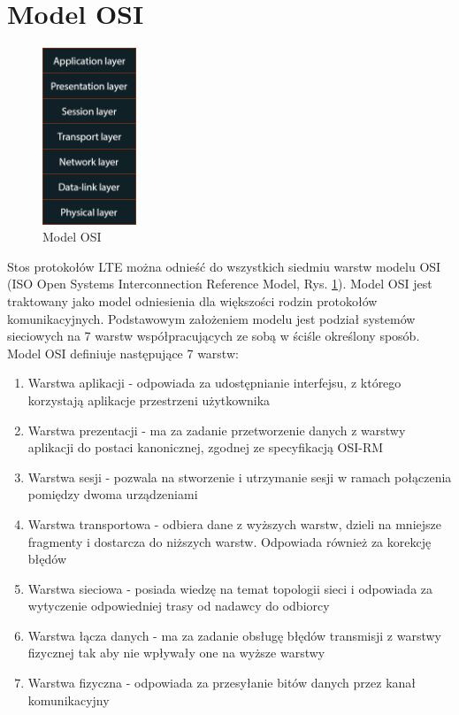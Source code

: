 \section{Model OSI}

\begin{figure}
	\centerline{\includegraphics[width=0.25\textwidth]{images/osi.png}}
	\caption{Model OSI}
	\label{fig:osi}
\end{figure}

Stos protokołów LTE można odnieść do wszystkich siedmiu warstw modelu OSI (ISO Open Systems Interconnection Reference Model, Rys. \ref{fig:osi}). Model OSI jest traktowany jako model odniesienia dla większości rodzin protokołów komunikacyjnych. Podstawowym założeniem modelu jest podział systemów sieciowych na 7 warstw współpracujących ze sobą w ściśle określony sposób. \cite{Wiki01} Model OSI definiuje następujące 7 warstw:

\begin{enumerate}
	\item Warstwa aplikacji - odpowiada za udostępnianie interfejsu, z którego korzystają aplikacje przestrzeni użytkownika
	\item Warstwa prezentacji - ma za zadanie przetworzenie danych z warstwy aplikacji do postaci kanonicznej, zgodnej ze specyfikacją OSI-RM
	\item Warstwa sesji - pozwala na stworzenie i utrzymanie sesji w ramach połączenia pomiędzy dwoma urządzeniami
	\item Warstwa transportowa - odbiera dane z wyższych warstw, dzieli na mniejsze fragmenty i dostarcza do niższych warstw. Odpowiada również za korekcję błędów
	\item Warstwa sieciowa - posiada wiedzę na temat topologii sieci i odpowiada za wytyczenie odpowiedniej trasy od nadawcy do odbiorcy
	\item Warstwa łącza danych - ma za zadanie obsługę błędów transmisji z warstwy fizycznej tak aby nie wpływały one na wyższe warstwy
	\item Warstwa fizyczna - odpowiada za przesyłanie bitów danych przez kanał komunikacyjny
\end{enumerate}

